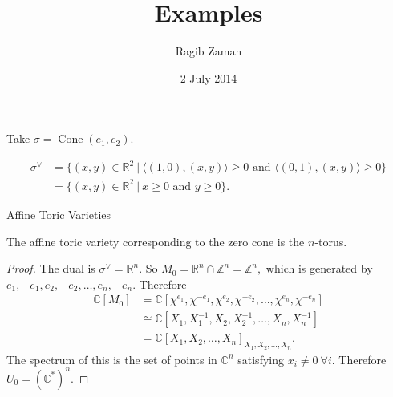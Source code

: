 \documentclass[11pt]{beamer}
\title{Examples}
\author{Ragib Zaman}
\institute{AMSSC at the University of Newcastle}
\date{2 July 2014}
\newcommand{\R}{\mathbb{R}}
\newcommand{\C}{\mathbb{C}}
\newcommand{\Z}{\mathbb{Z}}
\newcommand{\V}{\vee}
\DeclareMathOperator{\Cone}{Cone}
\begin{document}
\begin{frame}
\titlepage
\end{frame}

\begin{frame}
\begin{Example} Take $\sigma=\Cone(e_1, e_2).$
\begin{figure}[ht]
  \centering
  \label{figure:lattice1}
\end{figure}
\begin{align*}
\sigma^{\V} &= \{ (x,y)\in \R^2 \ | \ \langle (1,0), (x,y)\rangle \geq 0  \text{ and } \langle (0,1), (x,y) \rangle \geq 0 \} \\
            &= \{ (x,y) \in \R^2 \ | \ x\geq 0 \text{ and }  y\geq 0 \}.
\end{align*}

\end{Example}

\end{frame}

\begin{frame}{Affine Toric Varieties}
\begin{Lemma}
The affine toric variety corresponding to the zero cone is the $n$-torus.
\end{Lemma}

\begin{proof} The dual is $\sigma^{\vee}=\mathbb{R}^n.$ So $M_{0} = \R^n \cap \Z^n = \Z^n,$ which is generated by $e_1, -e_1, e_2, -e_2, \ldots, e_n, -e_n.$ Therefore
\begin{align*}
\C[M_0] &= \C[\chi^{e_1}, \chi^{-e_1}, \chi^{e_2}, \chi^{-e_2}, \ldots , \chi^{e_n}, \chi^{-e_n}] \\
        &\cong \C[X_1, X_1^{-1}, X_2, X_2^{-1}, \ldots, X_n, X_n^{-1}] \\
				&=\C[X_1, X_2, \ldots, X_n]_{X_1, X_2, \ldots, X_n}.
\end{align*}
The spectrum of this is the set of points in $\C^n$ satisfying $x_i \neq 0 \ \forall i.$ Therefore $U_0 = (\C^*)^n.$
\end{proof}
\end{frame}
\end{document}
